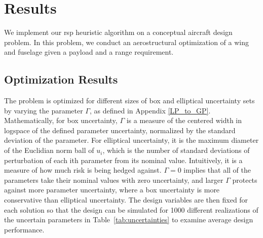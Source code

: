 \section{Results}

We implement our \gls{rsp} heuristic algorithm on a conceptual  aircraft design problem.
In this problem, we conduct an aerostructural optimization of a wing and fuselage given a payload and a range requirement. 

\subsection{Optimization Results}

The problem is optimized for different sizes of box and elliptical uncertainty sets
by varying the parameter $\Gamma$, as defined in Appendix \ref{LP_to_GP}. Mathematically, for box uncertainty,
$\Gamma$ is a measure of the centered width in logspace of the defined parameter uncertainty, normalized by the
standard deviation of the parameter. For elliptical uncertainty, it is the maximum diameter of the Euclidian norm
ball of $u_i$, which is the number of standard deviations of perturbation of each ith parameter from its nominal value.
Intuitively, it is a measure of how much risk is being hedged against. $\Gamma = 0$
implies that all of the parameters take their nominal values with zero uncertainty,
and larger $\Gamma$ protects against more parameter uncertainty, where a box uncertainty is
more conservative than elliptical uncertainty.
The design variables are then fixed for each solution so that the design can be simulated for
1000 different realizations of the uncertain parameters in Table~\ref{tab:uncertainties}
to examine average design performance.\\

